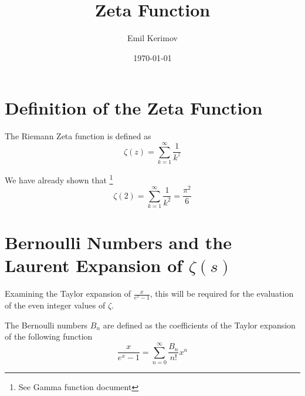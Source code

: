 \documentclass[a4paper]{article}
\title{Zeta Function}
\author{Emil Kerimov}
\date{\today}
\begin{document}
\maketitle



\section{Definition of the Zeta Function}\label{zf:sec:definition}

\begin{definition}\label{zf:zeta def}
The Riemann Zeta function is defined as 
$$
\zeta(z) = \sum_{k=1}^{\infty} \frac{1}{k^z}
$$
\end{definition}

We have already shown that \footnote{See Gamma function document}
\begin{equation}
\zeta(2) = \sum_{k=1}^{\infty} \frac{1}{k^2} =\frac{\pi^2}{6}
\end{equation}

\section{Bernoulli Numbers and the Laurent Expansion of \texorpdfstring{$\zeta(s)$}{zeta(s)}}\label{zf:sec:bernoulli-expansion}
Examining the Taylor expansion of $\frac{x}{e^x -1}$, this will be required for the evaluation of the even integer values of $\zeta.$

\begin{definition}\label{zf:bernoulli def}
The Bernoulli numbers $B_n$ are defined as the coefficients of the Taylor expansion of the following function
$$\boxed{
\frac{x}{e^x -1} = \sum_{n=0}^{\infty} \frac{B_n}{n!} x^n
}
$$
\end{definition}
\end{document}
